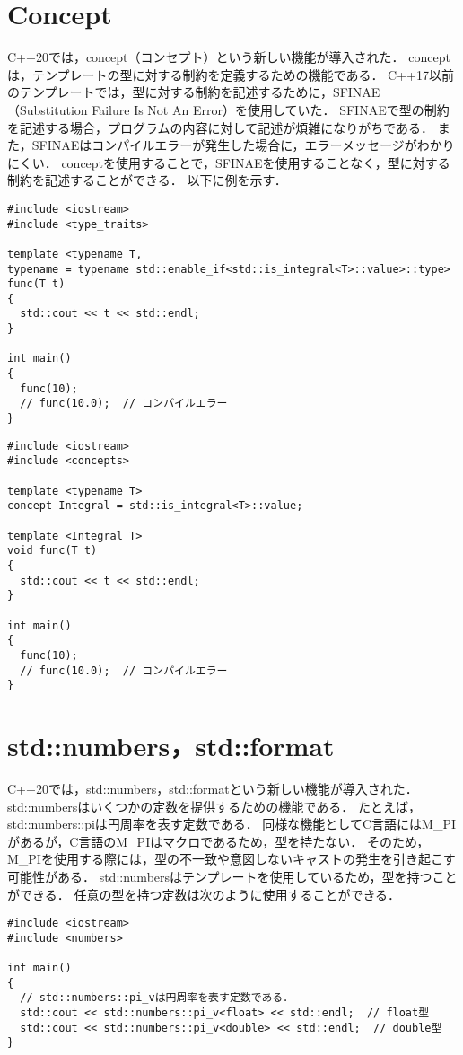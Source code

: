 \section{Concept}
C++20では，concept（コンセプト）という新しい機能が導入された．
conceptは，テンプレートの型に対する制約を定義するための機能である．
C++17以前のテンプレートでは，型に対する制約を記述するために，SFINAE（Substitution Failure Is Not An Error）を使用していた．
SFINAEで型の制約を記述する場合，プログラムの内容に対して記述が煩雑になりがちである．
また，SFINAEはコンパイルエラーが発生した場合に，エラーメッセージがわかりにくい．
conceptを使用することで，SFINAEを使用することなく，型に対する制約を記述することができる．
以下に例を示す．

\begin{lstlisting}[caption=SFINAE,label=sfinae]
#include <iostream>
#include <type_traits>

template <typename T, 
typename = typename std::enable_if<std::is_integral<T>::value>::type>
func(T t)
{
  std::cout << t << std::endl;
}

int main()
{
  func(10);
  // func(10.0);  // コンパイルエラー
}
\end{lstlisting}

\begin{lstlisting}[caption=concept,label=concept]
#include <iostream>
#include <concepts>

template <typename T>
concept Integral = std::is_integral<T>::value;

template <Integral T>
void func(T t)
{
  std::cout << t << std::endl;
}

int main()
{
  func(10);
  // func(10.0);  // コンパイルエラー
}

\end{lstlisting}

\section{std::numbers，std::format}
C++20では，std::numbers，std::formatという新しい機能が導入された．
std::numbersはいくつかの定数を提供するための機能である．
たとえば，std::numbers::piは円周率を表す定数である．
同様な機能としてC言語にはM\_PIがあるが，C言語のM\_PIはマクロであるため，型を持たない．
そのため，M\_PIを使用する際には，型の不一致や意図しないキャストの発生を引き起こす可能性がある．
std::numbersはテンプレートを使用しているため，型を持つことができる．
任意の型を持つ定数は次のように使用することができる．

\begin{lstlisting}[caption=std::numbers,label=std_number]
#include <iostream>
#include <numbers>

int main()
{
  // std::numbers::pi_vは円周率を表す定数である．  
  std::cout << std::numbers::pi_v<float> << std::endl;  // float型
  std::cout << std::numbers::pi_v<double> << std::endl;  // double型
}

\end{lstlisting}


